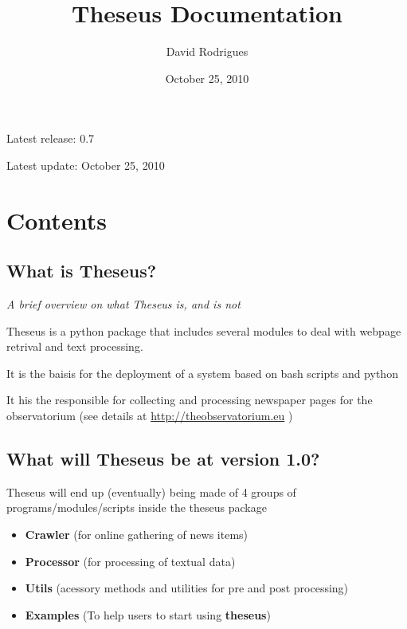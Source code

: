 \documentclass[letterpaper,10pt,english]{sphinxmanual}
\title{Theseus Documentation}
\date{October 25, 2010}
\author{David Rodrigues}
\begin{document}
\maketitle
\tableofcontents
{}\label{index::doc}


Latest release: 0.7

Latest update: October 25, 2010


\chapter{Contents}
\label{index:contents}\label{index:theseus-s-documentation}

\section{What is Theseus?}
\label{whatis:what-is-theseus}\label{whatis::doc}
\emph{A brief overview on what Theseus is, and is not}

Theseus is a python package that includes several modules to deal with webpage retrival and text processing.

It is the baisis for the deployment of a system based on bash scripts and python

It his the responsible for collecting and processing newspaper pages for the observatorium (see details at \href{http://theobservatorium.eu}{http://theobservatorium.eu} )


\section{What will Theseus be at version 1.0?}
\label{whatis:what-will-theseus-be-at-version-1-0}
Theseus will end up (eventually) being made of 4 groups of programs/modules/scripts inside the theseus package
\begin{itemize}
\item {} 
\textbf{Crawler} (for online gathering of news items)

\item {} 
\textbf{Processor} (for processing of textual data)

\item {} 
\textbf{Utils} (acessory methods and utilities for pre and post processing)

\item {} 
\textbf{Examples} (To help users to start using \textbf{theseus})

\end{itemize}
\end{document}
